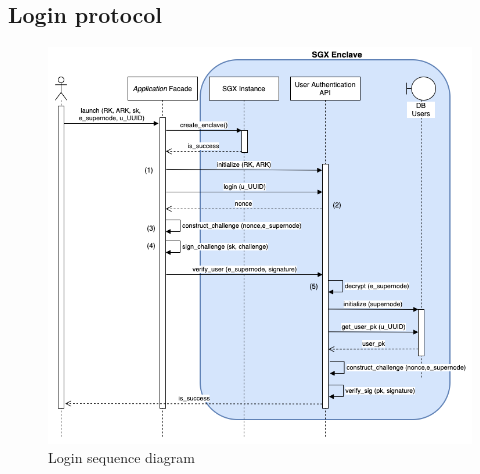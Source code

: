 \documentclass[../main.tex]{subfiles}
\begin{document}
\subsection{Login protocol}
\label{section:lauxus:login}
\begin{figure}[h]
    \centering
    \includegraphics[width=\textwidth]{images/lauxus/user_login}
    
    \caption{Login sequence diagram}
    \label{figure:lauxus:login}
\end{figure}
\end{document}
